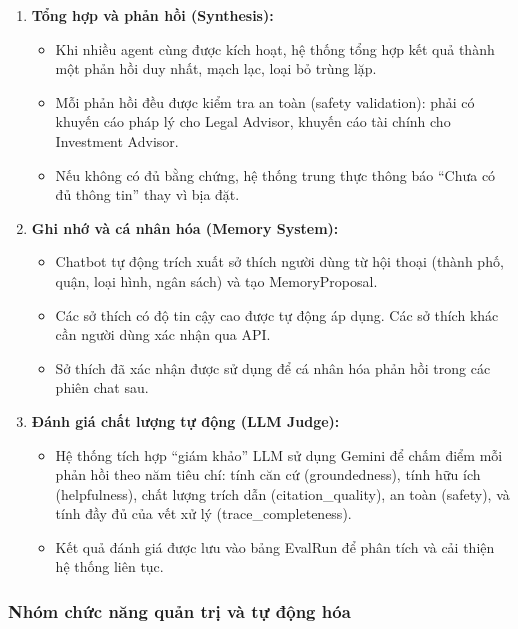 \begin{enumerate}
    \item \textbf{Tổng hợp và phản hồi (Synthesis):}
    \begin{itemize}
        \item Khi nhiều agent cùng được kích hoạt, hệ thống tổng hợp kết quả thành một phản hồi duy nhất, mạch lạc, loại bỏ trùng lặp.
        \item Mỗi phản hồi đều được kiểm tra an toàn (safety validation): phải có khuyến cáo pháp lý cho Legal Advisor, khuyến cáo tài chính cho Investment Advisor.
        \item Nếu không có đủ bằng chứng, hệ thống trung thực thông báo ``Chưa có đủ thông tin'' thay vì bịa đặt.
    \end{itemize}

    \item \textbf{Ghi nhớ và cá nhân hóa (Memory System):}
    \begin{itemize}
        \item Chatbot tự động trích xuất sở thích người dùng từ hội thoại (thành phố, quận, loại hình, ngân sách) và tạo MemoryProposal.
        \item Các sở thích có độ tin cậy cao được tự động áp dụng. Các sở thích khác cần người dùng xác nhận qua API.
        \item Sở thích đã xác nhận được sử dụng để cá nhân hóa phản hồi trong các phiên chat sau.
    \end{itemize}

    \item \textbf{Đánh giá chất lượng tự động (LLM Judge):}
    \begin{itemize}
        \item Hệ thống tích hợp ``giám khảo'' LLM sử dụng Gemini để chấm điểm mỗi phản hồi theo năm tiêu chí: tính căn cứ (groundedness), tính hữu ích (helpfulness), chất lượng trích dẫn (citation\_quality), an toàn (safety), và tính đầy đủ của vết xử lý (trace\_completeness).
        \item Kết quả đánh giá được lưu vào bảng EvalRun để phân tích và cải thiện hệ thống liên tục.
    \end{itemize}
\end{enumerate}

\subsubsection{Nhóm chức năng quản trị và tự động hóa}

